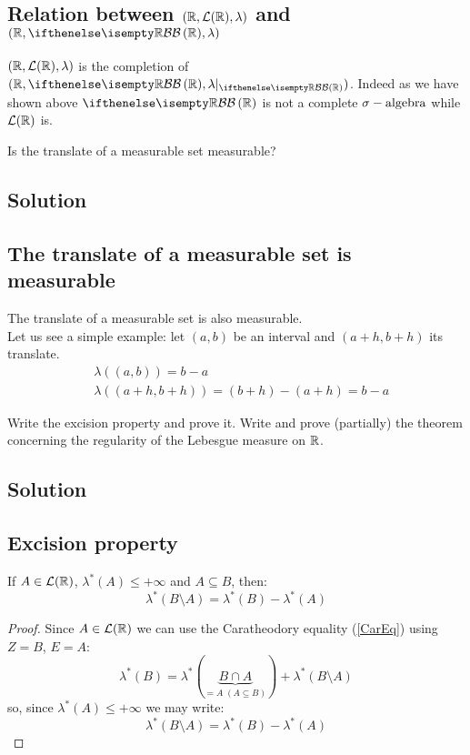 \subsection{Relation between \texorpdfstring{$(\mathbb{R},\mathcal{L}(\mathbb{R}),\lambda)$}{(R,L(R),l)} and \texorpdfstring{$(\R,\B[\R],\lambda)$}{(R,B(R),l)}}
$(\mathbb{R},\mathcal{L}(\mathbb{R}),\lambda)$ is the completion of $(\R,\B[\R],\lambda|_{\B[\R]})$. Indeed as we have shown above $\B[\R]$ is not a complete $\sigma-\text{algebra}$ while $\mathcal{L}(\mathbb{R})$ is.


\question
Is the translate of a measurable set measurable?

\subsection*{Solution}

\subsection{The translate of a measurable set is measurable}
The translate of a measurable set is also measurable. \\
Let us see a simple example: let $(a,b)$ be an interval and $(a+h,b+h)$ its translate.
\begin{align*}
    & \lambda((a,b)) = b-a \\
    & \lambda((a+h,b+h)) = (b+h)-(a+h) = b-a
\end{align*}


\question
Write the excision property and prove it. Write and prove (partially) the theorem concerning
the regularity of the Lebesgue measure on $\mathbb{R}$.

\subsection*{Solution}
\subsection{Excision property}\label{ExcProp}
If $A\in\mathcal{L}(\mathbb{R})$, $\lambda^*(A)\leq +\infty$ and $A\subseteq B$, then:
\[
    \lambda^*(B\setminus A) = \lambda^* (B) - \lambda^*(A)    
\]
\begin{proof}
    Since $A\in\mathcal{L}(\mathbb{R})$ we can use the Caratheodory equality (\ref{CarEq}) using $Z=B$, $E=A$:
    \[
        \lambda^*(B) = \lambda^*(\underbrace{B\cap A}_{=A \; (A\subseteq B)}) + \lambda^* (B\setminus A)    
    \]
    so, since $\lambda^*(A)\leq +\infty$ we may write:
    \[
        \lambda^*(B\setminus A) = \lambda^*(B)-\lambda^*(A)  
    \]
\end{proof}

